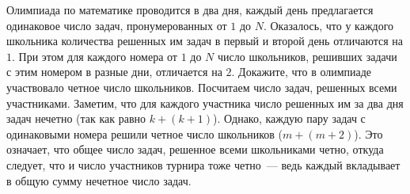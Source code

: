 \problem
Олимпиада по математике проводится в два дня, каждый день предлагается
одинаковое число задач, пронумерованных от $1$ до $N$.
Оказалось, что у каждого школьника количества решенных им задач в первый и
второй день отличаются на $1$.
При этом для каждого номера от $1$ до $N$ число школьников, решивших задачи с
этим номером в разные дни, отличается на $2$.
Докажите, что в олимпиаде участвовало четное число школьников.
\solution
Посчитаем число задач, решенных всеми участниками.
Заметим, что для каждого участника число решенных им за два дня задач нечетно
(так как равно $k + (k + 1)$).
Однако, каждую пару задач с одинаковыми номера решили четное число школьников
($m + (m + 2)$).
Это означает, что общее число задач, решенное всеми школьниками четно, откуда
следует, что и число участников турнира тоже четно~--- ведь каждый вкладывает
в общую сумму нечетное число задач.
\endproblem
